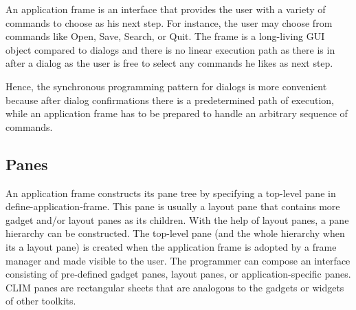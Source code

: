 \documentclass[twocolumn,a4paper]{article}
\newcommand {\code}[1]{{\sffamily #1}}
\newcommand {\CLIM}{{\small CLIM}}
\let\method\code
\let\macro\code
\begin{document}
An application frame is an interface that provides the user with a variety of commands to choose as his next step. For instance, the user may choose from commands like Open, Save, Search, or Quit. The frame is a long-living GUI object compared to dialogs and there is no linear execution path as there is in after a dialog as the user is free to select any commands he likes as next step.

Hence, the synchronous programming pattern for dialogs is more convenient because after dialog confirmations there is a predetermined path of execution, while an application frame has to be prepared to handle an arbitrary sequence of commands.




\subsection{Panes}

An application frame constructs its pane tree by specifying a top-level pane in \macro{define-application-frame}. This pane is usually a layout pane that contains more gadget and/or layout panes as its children. With the help of layout panes, a pane hierarchy can be constructed. The top-level pane (and the whole hierarchy when its a layout pane) is created when the application frame is adopted by a frame manager and made visible to the user. The programmer can compose an interface consisting of pre-defined gadget panes, layout panes, or application-specific panes. \CLIM{} panes are rectangular sheets that are analogous to the gadgets or widgets of other toolkits. 
\end{document}
